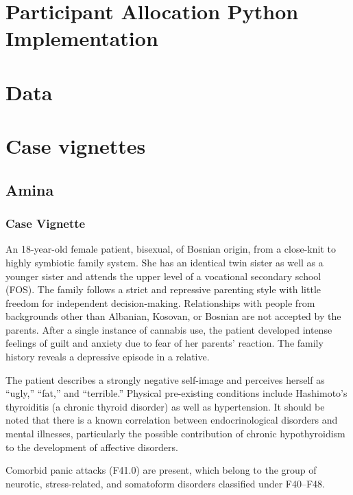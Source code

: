 
\section{Participant Allocation Python Implementation}
\label{app:palloc}
 \faDownload

\section{Data}
\label{app:data}
 \faDownload



\section{Case vignettes}
\label{app:cases}

\subsection{Amina \autocite[slide~8]{dbjr_stoerungsbilder}}
\label{app:AminaFull}
\subsubsection{Case Vignette}
An 18-year-old female patient, bisexual, of Bosnian origin, from a close-knit to highly symbiotic family system.
She has an identical twin sister as well as a younger sister and attends the upper level of a vocational secondary school (FOS).
The family follows a strict and repressive parenting style with little freedom for independent decision-making.
Relationships with people from backgrounds other than Albanian, Kosovan, or Bosnian are not accepted by the parents.
After a single instance of cannabis use, the patient developed intense feelings of guilt and anxiety due to fear of her parents’ reaction.
The family history reveals a depressive episode in a relative.

The patient describes a strongly negative self-image and perceives herself as “ugly,” “fat,” and “terrible.” Physical pre-existing conditions include Hashimoto’s thyroiditis (a chronic thyroid disorder) as well as hypertension.
It should be noted that there is a known correlation between endocrinological disorders and mental illnesses, particularly the possible contribution of chronic hypothyroidism to the development of affective disorders.

Comorbid panic attacks (F41.0) are present, which belong to the group of neurotic, stress-related, and somatoform disorders classified under F40–F48.

